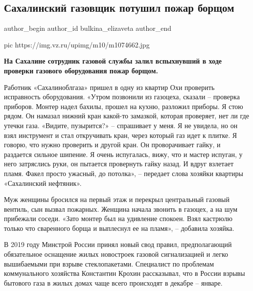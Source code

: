 
 
 
 
 
 
\subsection{Сахалинский газовщик потушил пожар борщом}
\label{sec:08_12_2020.news.ru.vz.bulkina_elizaveta.1.sahalin_borsch}
\ifcmt
	author_begin
   author_id bulkina_elizaveta
	author_end
\fi

\ifcmt
pic https://img.vz.ru/upimg/m10/m1074662.jpg
\fi


\textbf{На Сахалине сотрудник газовой службы залил вспыхнувший в ходе проверки
газового оборудования пожар борщом.}

Работник «Сахалиноблгаза» пришел в одну из квартир Охи проверить исправность
оборудования. «Утром позвонили из газоцеха, сказали – проверка приборов. Монтер
надел бахилы, прошел на кухню, разложил приборы. Я стою рядом. Он намазал
нижний кран какой-то замазкой, которая проверяет, нет ли где утечки газа.
«Видите, пузырится?» – спрашивает у меня. Я не увидела, но он взял инструмент и
стал откручивать кран, через который газ идет к плитке. Я говорю, что нужно
проверить и другой кран. Он проворачивает гайку, и раздается сильное шипение. Я
очень испугалась, вижу, что и мастер испуган, у него затряслись руки, он
пытается провернуть гайку назад. И вдруг взлетает пламя. Факел просто ужасный,
до потолка», – передает слова хозяйки квартиры «Сахалинский нефтяник».

Муж женщины бросился на первый этаж и перекрыл центральный газовый вентиль, сын
вызвал пожарных. Женщина начала звонить в газоцех, а на шум прибежали соседи.
«Зато монтер был на удивление спокоен. Взял кастрюлю только что сваренного
борща и выплеснул ее на пламя», – добавила хозяйка. 

В 2019 году Минстрой России принял новый свод правил, предполагающий
обязательное оснащение жилых новостроек газовой сигнализацией и легко
вышибаемыми при взрыве стеклопакетами. Специалист по проблемам коммунального
хозяйства Константин Крохин рассказывал, что в России взрывы бытового газа в
жилых домах чаще всего происходят в декабре – январе.
